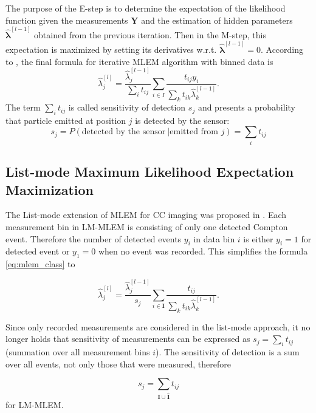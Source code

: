 The purpose of the E-step is to determine the expectation of the likelihood function given the measurements $\mathbf{Y}$ and the estimation of hidden parameters $\mathbf{\hat{\lambda}}^{[l-1]}$ obtained from the previous iteration. 
Then in the M-step, this expectation is maximized by setting its derivatives w.r.t. $\mathbf{\hat{\lambda}}^{[l-1]}=0$.
According to \cite{MLEM_Lange_Carlson_1984}, the final formula for iterative \ac{MLEM} algorithm with binned data is 
\begin{equation}
  \hat{\lambda}_{j}^{[l]} = \frac{\hat{\lambda}_{j}^{[l-1]}}{\sum_{i}t_{ij}} \sum_{i \in I} \frac{t_{ij} y_{i}}{\sum_{k} t_{ik} \hat{\lambda}_{k}^{[l-1]}}.
  \label{eq:mlem_class}
\end{equation}
The term $\sum_{i}t_{ij}$ is called sensitivity of detection $s_{j}$ and presents a probability that particle emitted at position $j$ is detected by the sensor:
\begin{equation}
  s_{j} = P(\textrm{detected by the sensor}\ | \textrm{emitted from } j) =  \sum_{i}t_{ij}
\end{equation}

\subsection{List-mode Maximum Likelihood Expectation Maximization}
The List-mode extension of \ac{MLEM} for \ac{CC} imaging was proposed in \cite{wilderman}.
Each measurement bin in \ac{LM-MLEM} is consisting of only one detected Compton event.
Therefore the number of detected events $y_{i}$ in data bin $i$ is either $y_{i} = 1$ for detected event or $y_{1} = 0$ when no event was recorded.
This simplifies the formula \ref{eq:mlem_class} to

\begin{equation}
  \hat{\lambda}_{j}^{[l]} = \frac{\hat{\lambda}_{j}^{[l-1]}}{s_{j}} \sum_{i \in \mathbf{I}}\frac{t_{ij} }{\sum_{k} t_{ik} \hat{\lambda}_{k}^{[l-1]}}.
  \label{eq:lmmlem}
\end{equation}

Since only recorded measurements are considered in the list-mode approach, it no longer holds that sensitivity of measurements can be expressed as $s_{j} = \sum_{i}t_{ij}$ (summation over all measurement bins $i$).
The sensitivity of detection is a sum over all events, not only those that were measured, therefore 

\begin{equation}
s_{j} = \sum_{\mathbf{I} \cup \mathbf{\hat{I}}} t_{ij} 
\end{equation}
for \ac{LM-MLEM}.

